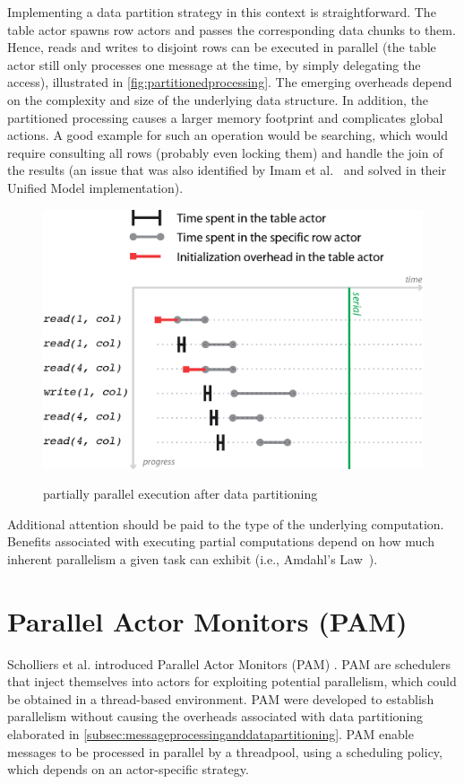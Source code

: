 \documentclass[11pt, journal]{IEEEtran}
\begin{document}
Implementing a data partition strategy in this context is straightforward. The table actor spawns row actors and passes the corresponding data chunks to them. Hence, reads and writes to disjoint rows can be executed in parallel (the table actor still only processes one message at the time, by simply delegating the access), illustrated in \autoref{fig:partitionedprocessing}. The emerging overheads depend on the complexity and size of the underlying data structure. In addition, the partitioned processing causes a larger memory footprint and complicates global actions. A good example for such an operation would be searching, which would require consulting all rows (probably even locking them) and handle the join of the results (an issue that was also identified by Imam et al.~\cite{Imam:2012:ITP:2384616.2384671} and solved in their Unified Model implementation).
\begin{figure}[!htbp]
	\centering
	\includegraphics[width=\columnwidth]{figures/processing-02.eps}
	\begin{caption} {partially parallel execution} after data partitioning\label{fig:partitionedprocessing}\end{caption}
\end{figure}
Additional attention should be paid to the type of the underlying computation. Benefits associated with executing partial computations depend on how much inherent parallelism a given task can exhibit (i.e., Amdahl's Law~\cite{Amdahl:1967:VSP:1465482.1465560, chen}).

\section{Parallel Actor Monitors (PAM)}\label{sec:pam}
Scholliers et al. introduced Parallel Actor Monitors (PAM) \cite{Scholliers2010a}. PAM are schedulers that inject themselves into actors for exploiting potential parallelism, which could be obtained in a thread-based environment. PAM were developed to establish parallelism without causing the overheads associated with data partitioning elaborated in \autoref{subsec:messageprocessinganddatapartitioning}. PAM enable messages to be processed in parallel by a threadpool, using a scheduling policy, which depends on an actor-specific strategy.
\end{document}
